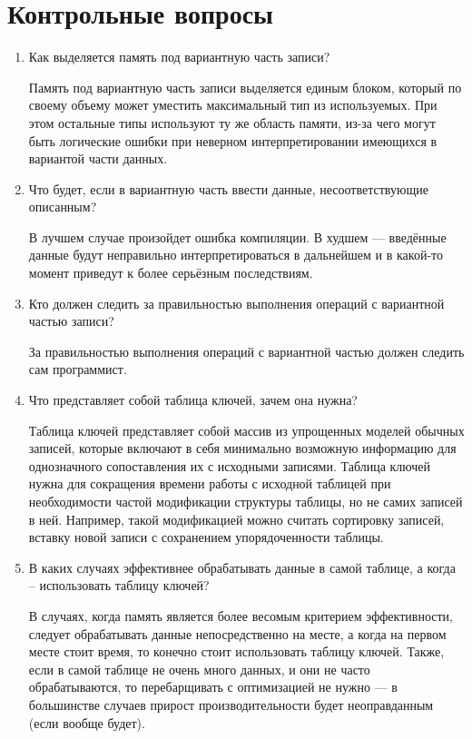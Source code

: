 \chapter{Контрольные вопросы}

\begin{enumerate}
	\item Как выделяется память под вариантную часть записи?
	
	Память  под  вариантную  часть  записи  выделяется  единым  блоком, который  по  своему  объему  может  уместить  максимальный  тип  из используемых. При этом остальные типы используют ту же область памяти, 
	из-за чего могут быть логические ошибки при неверном интерпретировании имеющихся в вариантой части данных.
	
	\item Что  будет, если  в  вариантную  часть  ввести  данные,  несоответствующие 
	описанным?
	
	В  лучшем  случае  произойдет  ошибка  компиляции.  В  худшем  — введённые  данные будут неправильно интерпретироваться в дальнейшем и в какой-то момент приведут к более серьёзным последствиям.
	\item Кто  должен  следить  за  правильностью  выполнения  операций  с  вариантной 
	частью записи? 
	
	За правильностью выполнения операций с вариантной частью должен следить сам программист.
	
	\item Что представляет собой таблица ключей, зачем она нужна?
	
	Таблица ключей  представляет собой массив из упрощенных моделей обычных  записей,  которые  включают  в  себя  минимально  возможную информацию для однозначного сопоставления их с исходными записями. 
	Таблица ключей нужна для сокращения времени работы с исходной таблицей при необходимости частой модификации структуры таблицы, но не самих  записей  в  ней.  Например,  такой  модификацией  можно  считать сортировку записей, вставку новой записи с сохранением упорядоченности таблицы.
	
	\item В каких случаях эффективнее обрабатывать данные в самой таблице, а когда – 
	использовать таблицу ключей?
	
	В  случаях,  когда  память  является  более  весомым  критерием эффективности, следует обрабатывать данные непосредственно на месте, а когда на первом месте стоит время, то конечно стоит использовать таблицу ключей. 
	Также, если в самой таблице не очень много данных, и они не часто обрабатываются,  то  перебарщивать  с  оптимизацией не  нужно  — в большинстве  случаев  прирост  производительности  будет  неоправданным (если вообще будет). 
	

\end{enumerate}
